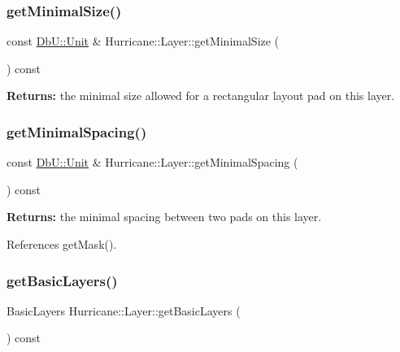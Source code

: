 \subsubsection{\texorpdfstring{get\+Minimal\+Size()}{getMinimalSize()}}
{\footnotesize\ttfamily const \hyperlink{group__DbUGroup_ga4fbfa3e8c89347af76c9628ea06c4146}{Db\+U\+::\+Unit} \& Hurricane\+::\+Layer\+::get\+Minimal\+Size (\begin{DoxyParamCaption}{ }\end{DoxyParamCaption}) const\hspace{0.3cm}{\ttfamily [inline]}}

{\bfseries Returns\+:} the minimal size allowed for a rectangular layout pad on this layer. \mbox{\label{classHurricane_1_1Layer_a6a03f9f40ca855d33763497162414062}} 
\subsubsection{\texorpdfstring{get\+Minimal\+Spacing()}{getMinimalSpacing()}}
{\footnotesize\ttfamily const \hyperlink{group__DbUGroup_ga4fbfa3e8c89347af76c9628ea06c4146}{Db\+U\+::\+Unit} \& Hurricane\+::\+Layer\+::get\+Minimal\+Spacing (\begin{DoxyParamCaption}{ }\end{DoxyParamCaption}) const\hspace{0.3cm}{\ttfamily [inline]}}

{\bfseries Returns\+:} the minimal spacing between two pads on this layer. 

References get\+Mask().

\mbox{\label{classHurricane_1_1Layer_a7e953c126a02952e3a0b0d32f37e2ae0}} 
\subsubsection{\texorpdfstring{get\+Basic\+Layers()}{getBasicLayers()}}
{\footnotesize\ttfamily Basic\+Layers Hurricane\+::\+Layer\+::get\+Basic\+Layers (\begin{DoxyParamCaption}{ }\end{DoxyParamCaption}) const\hspace{0.3cm}{\ttfamily [pure virtual]}}

